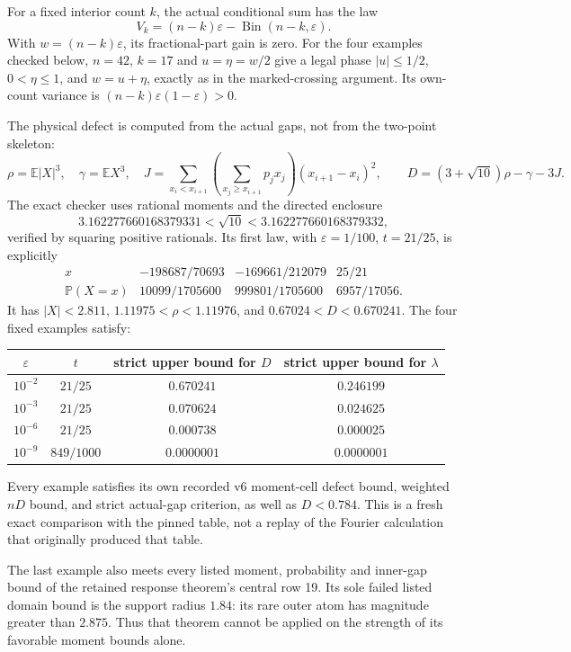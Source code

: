 \documentclass[11pt]{article}
\newcommand{\E}{\mathbb E}
\newcommand{\Pp}{\mathbb P}
\begin{document}
For a fixed interior count $k$, the actual conditional sum has the law
\[
 V_k=(n-k)\varepsilon-\operatorname{Bin}(n-k,\varepsilon).
\]
With $w=(n-k)\varepsilon$, its fractional-part gain is zero. For the four
examples checked below, $n=42$, $k=17$ and
$u=\eta=w/2$ give a legal phase $|u|\le1/2$, $0<\eta\le1$, and
$w=u+\eta$, exactly as in the marked-crossing argument. Its own-count
variance is $(n-k)\varepsilon(1-\varepsilon)>0$.

The physical defect is computed from the actual gaps, not from the
two-point skeleton:
\[
 \rho=\E|X|^3,\quad\gamma=\E X^3,\quad
 J=\sum_{x_i<x_{i+1}}
       \left(\sum_{x_j\ge x_{i+1}}p_jx_j\right)(x_{i+1}-x_i)^2,
 \qquad D=(3+\sqrt{10})\rho-\gamma-3J.
\]
The exact checker uses rational moments and the directed enclosure
\[
 3.162277660168379331<\sqrt{10}<3.162277660168379332,
\]
verified by squaring positive rationals. Its first law, with
$\varepsilon=1/100$, $t=21/25$, is explicitly
\[
\begin{array}{c|ccc}
x&-198687/70693&-169661/212079&25/21\\\hline
\Pp(X=x)&10099/1705600&999801/1705600&6957/17056.
\end{array}
\]
It has $|X|<2.811$, $1.11975<\rho<1.11976$, and
$0.67024<D<0.670241$. The four fixed examples satisfy:
\begin{center}\small
\begin{tabular}{@{}cccc@{}}\toprule
$\varepsilon$ & $t$ & strict upper bound for $D$ & strict upper bound for $\lambda$\\\midrule
$10^{-2}$ & $21/25$ & $0.670241$ & $0.246199$\\
$10^{-3}$ & $21/25$ & $0.070624$ & $0.024625$\\
$10^{-6}$ & $21/25$ & $0.000738$ & $0.000025$\\
$10^{-9}$ & $849/1000$ & $0.0000001$ & $0.0000001$\\\bottomrule
\end{tabular}
\end{center}
Every example satisfies its own recorded v6 moment-cell defect bound,
weighted $nD$ bound, and strict actual-gap criterion, as well as $D<0.784$.
This is a fresh exact comparison with the pinned table, not a replay of
the Fourier calculation that originally produced that table.

The last example also meets every listed moment, probability and inner-gap
bound of the retained response theorem's central row 19. Its sole failed
listed domain bound is the support radius $1.84$: its rare outer atom has
magnitude greater than $2.875$. Thus that theorem cannot be applied on
the strength of its favorable moment bounds alone.
\end{document}
